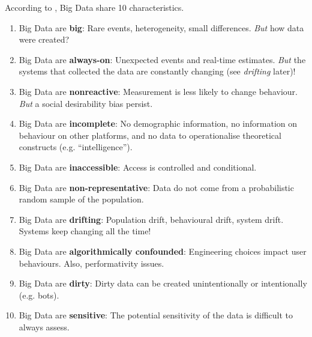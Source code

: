 \documentclass[serif, aspectratio=169]{beamer}
\begin{document}
\begin{frame}

According to \autocite{salganik_bit_2018}, Big Data share 10 characteristics. 

\begin{enumerate}

\item<1-> Big Data are \textbf{big}: Rare events, heterogeneity, small differences. \textit{But} how data were created?

\item<2-> Big Data are \textbf{always-on}: Unexpected events and real-time estimates. \textit{But} the systems that collected the data are constantly changing (see \textit{drifting} later)!

\item<3-> Big Data are \textbf{nonreactive}: Measurement is less likely to change behaviour. \textit{But} a social desirability bias persist. 

\item<4-> Big Data are \textbf{incomplete}: No demographic information, no information on behaviour on other platforms, and no data to operationalise theoretical constructs (e.g. \enquote{intelligence}).

\item<5-> Big Data are \textbf{inaccessible}: Access is controlled and conditional. 

\end{enumerate}

\end{frame}

\begin{frame} 

\begin{enumerate}

\setcounter{enumi}{5}

\item<1-> Big Data are \textbf{non-representative}: Data do not come from a probabilistic random sample of the population. 

\item<2-> Big Data are \textbf{drifting}: Population drift, behavioural drift, system drift. Systems keep changing all the time!

\item<3-> Big Data are \textbf{algorithmically confounded}: Engineering choices impact user behaviours. Also, performativity issues.

\item<4-> Big Data are \textbf{dirty}: Dirty data can be created unintentionally or intentionally (e.g. bots). 

 \item<5-> Big Data are \textbf{sensitive}: The potential sensitivity of the data is difficult to always assess. 

\end{enumerate}

\end{frame}
\end{document}
